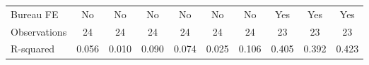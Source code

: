 {\begin{tabular}{l*{9}{c}}
Bureau FE   &          No         &          No         &          No         &          No         &          No         &          No         &         Yes         &         Yes         &         Yes         \\
Observations&          24         &          24         &          24         &          24         &          24         &          24         &          23         &          23         &          23         \\
R-squared   &       0.056         &       0.010         &       0.090         &       0.074         &       0.025         &       0.106         &       0.405         &       0.392         &       0.423         \\
\bottomrule
\end{tabular}
}
